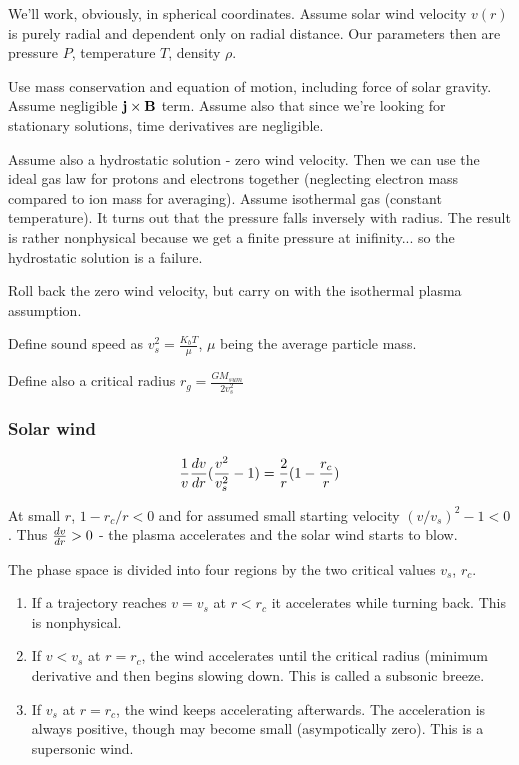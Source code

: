 \documentclass[PlasmaNotes.tex]{subfiles}
\begin{document}
We'll work, obviously, in spherical coordinates. Assume solar wind velocity $v(r)$ is purely radial and dependent only on radial distance. Our parameters then are pressure $P$, temperature $T$, density $\rho$.

Use mass conservation and equation of motion, including force of solar gravity. Assume negligible $\mathbf{j} \times \mathbf{B}$ term. Assume also that since we're looking for stationary solutions, time derivatives are negligible.

Assume also a hydrostatic solution - zero wind velocity. Then we can use the ideal gas law for protons and electrons together (neglecting electron mass compared to ion mass for averaging). Assume isothermal gas (constant temperature). It turns out that the pressure falls inversely with radius. The result is rather nonphysical because we get a finite pressure at inifinity... so the hydrostatic solution is a failure.

Roll back the zero wind velocity, but carry on with the isothermal plasma assumption. 

Define sound speed as $v_s^2=\frac{K_b T}{\mu}$, $\mu$ being the average particle mass.

Define also a critical radius $r_g = \frac{G M_{sum}}{2 v_s^2}$

\subsubsection{Solar wind}

\[ \frac{1}{v} \frac{d v}{d r} (\frac{v^2}{v_s^2}-1) = \frac{2}{r}(1-\frac{r_c}{r}) \]

At small $r$, $1-r_c/r<0$ and for assumed small starting velocity $(v/v_s)^2-1 < 0$. Thus $\frac{d v}{d r}>0$ - the plasma accelerates and the solar wind starts to blow.

The phase space is divided into four regions by the two critical values $v_s$, $r_c$.

\begin{enumerate}
\item If a trajectory reaches $v=v_s$ at $r<r_c$ it accelerates while turning back. This is nonphysical.

\item If $v<v_s$ at $r=r_c$, the wind accelerates until the critical radius (minimum derivative and then begins slowing down. This is called a subsonic breeze.

\item If $v_s$ at $r=r_c$, the wind keeps accelerating afterwards. The acceleration is always positive, though may become small (asympotically zero). This is a supersonic wind.
\end{enumerate}
\end{document}
